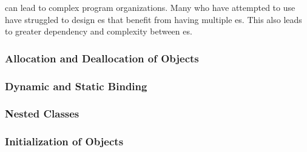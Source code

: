  can lead to complex program organizations.
Many who have attempted to use  have struggled to design es that benefit from having multiple es.
This also leads to greater dependency and complexity between es.

\subsubsection{Allocation and Deallocation of Objects}\label{subsubsec:OOP_Object_Allocation_Deallocation}
\subsubsection{Dynamic and Static Binding}\label{subsubsec:OOP_Dynamic_Static_Binding}
\subsubsection{Nested Classes}\label{subsubsec:OOP_Nested_Classes}
\subsubsection{Initialization of Objects}\label{subsubsec:OOP_Object_Initialization}

